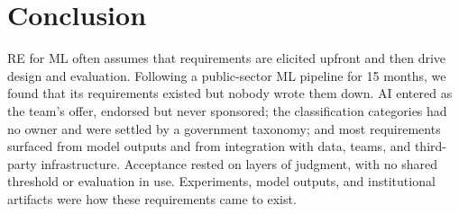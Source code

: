 \documentclass[sigconf,nonacm]{acmart}
\newif\ifshownotes
\newcommand{\gnote}[1]{\ifshownotes{\color{blue}\textbf{[G:} #1\textbf{]}}\fi}
\begin{document}

\section{Conclusion}
\label{sec:conclusion}
RE for ML often assumes that requirements are elicited upfront and then drive design and evaluation. Following a public-sector ML pipeline for 15 months, we found that its requirements existed but nobody wrote them down. AI entered as the team's offer, endorsed but never sponsored; the classification categories had no owner and were settled by a government taxonomy; and most requirements surfaced from model outputs and from integration with data, teams, and third-party infrastructure. Acceptance rested on layers of judgment, with no shared threshold or evaluation in use. Experiments, model outputs, and institutional artifacts were how these requirements came to exist.



\end{document}
